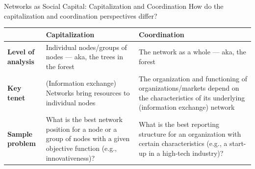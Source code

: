 \documentclass[notes, aspectratio=1610]{beamer}
\begin{document}
\begin{frame}{Networks as Social Capital: Capitalization and Coordination}
	{How do the capitalization and coordination perspectives differ?}
	\small
	\begin{table}
	\begin{center}
		\begin{tabular}[c]{p{2.75cm}|p{4.5cm}|p{4.5cm}}
			\textbf{} &
			\textbf{Capitalization} & 
			\textbf{Coordination} \\
			\hline
			\textbf{Level of analysis} &
			Individual nodes/groups of nodes --- aka, the trees 
			in the forest &
			The network as a whole --- aka, the forest \\ \hline
			\textbf{Key tenet} &
			(Information exchange) Networks bring resources to 
			individual nodes & 
			The organization and functioning of organizations/markets 
			depend on the characteristics of its underlying 
			(information exchange) network \\ \hline
			\textbf{Sample problem} &
			What is the best network position for a node or a group 
			of nodes with a given objective function (e.g.,
			innovativeness)? & What is the best reporting structure
			for an organization with certain characteristics (e.g.,
			a start-up in a high-tech industry)?\\
			\hline
		\end{tabular}
	\end{center}
	\end{table}	
\end{frame}
\end{document}
